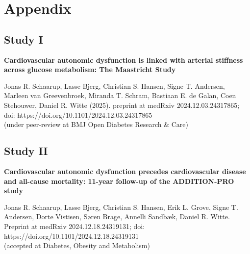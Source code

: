 \documentclass[
  a4paper,
  headsepline=true,
  open=left]{scrbook}
\begin{document}
\clearpage
\null
\thispagestyle{empty}
\clearpage

\cleardoublepage
{}
{}
\appendix

\hypertarget{sec-more-results}{%
\chapter{Appendix}\label{sec-more-results}}

\hypertarget{study-i-1}{%
\section{Study I}\label{study-i-1}}

\textbf{Cardiovascular autonomic dysfunction is linked with arterial
stiffness across glucose metabolism: The Maastricht Study}

Jonas R. Schaarup, Lasse Bjerg, Christian S. Hansen, Signe T. Andersen,
Marleen van Greevenbroek, Miranda T. Schram, Bastiaan E. de Galan, Coen
Stehouwer, Daniel R. Witte (2025). preprint at medRxiv
2024.12.03.24317865; doi: https://doi.org/10.1101/2024.12.03.24317865\\
(under peer-review at BMJ Open Diabetes Research \& Care)

\clearpage
\null
\thispagestyle{empty}
\clearpage






\newpage
\restoregeometry

\newpage

\thispagestyle{empty}

\newpage

\hypertarget{study-ii-1}{%
\section{Study II}\label{study-ii-1}}

\textbf{Cardiovascular autonomic dysfunction precedes cardiovascular
disease and all-cause mortality: 11-year follow-up of the ADDITION-PRO
study}

Jonas R. Schaarup, Lasse Bjerg, Christian S. Hansen, Erik L. Grove,
Signe T. Andersen, Dorte Vistisen, Søren Brage, Annelli Sandbæk, Daniel
R. Witte.\\
Preprint at medRxiv 2024.12.18.24319131; doi:
https://doi.org/10.1101/2024.12.18.24319131\\
(accepted at Diabetes, Obesity and Metabolism)
\end{document}
